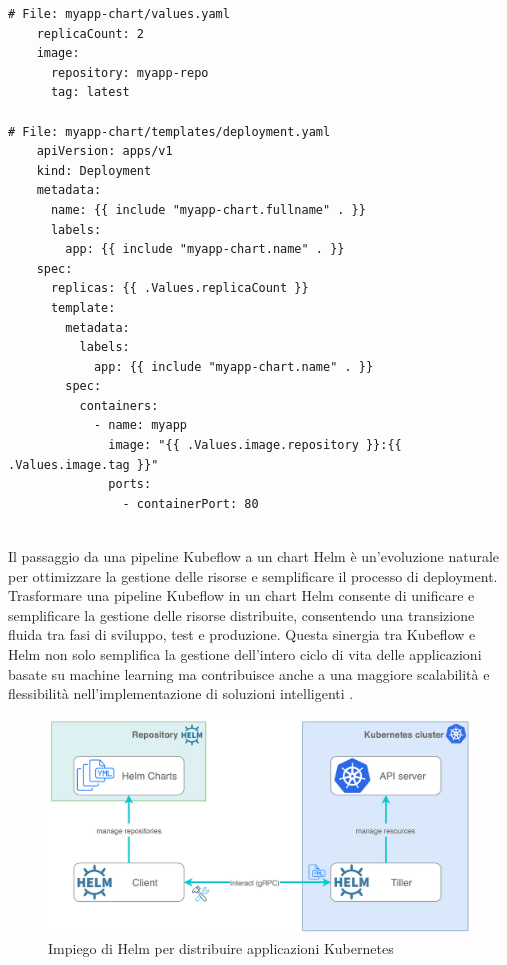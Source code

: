 \begin{code}
\label{code:apx:a:yaml}
\begin{verbatim}
# File: myapp-chart/values.yaml
    replicaCount: 2
    image:
      repository: myapp-repo
      tag: latest
    
# File: myapp-chart/templates/deployment.yaml
    apiVersion: apps/v1
    kind: Deployment
    metadata:
      name: {{ include "myapp-chart.fullname" . }}
      labels:
        app: {{ include "myapp-chart.name" . }}
    spec:
      replicas: {{ .Values.replicaCount }}
      template:
        metadata:
          labels:
            app: {{ include "myapp-chart.name" . }}
        spec:
          containers:
            - name: myapp
              image: "{{ .Values.image.repository }}:{{ .Values.image.tag }}"
              ports:
                - containerPort: 80
    
\end{verbatim}
\end{code}

Il passaggio da una pipeline Kubeflow a un chart Helm è un'evoluzione naturale per ottimizzare la gestione delle risorse e semplificare il processo di deployment. Trasformare una pipeline Kubeflow in un chart Helm consente di unificare e semplificare la gestione delle risorse distribuite, consentendo una transizione fluida tra fasi di sviluppo, test e produzione. Questa sinergia tra Kubeflow e Helm non solo semplifica la gestione dell'intero ciclo di vita delle applicazioni basate su machine learning ma contribuisce anche a una maggiore scalabilità e flessibilità nell'implementazione di soluzioni intelligenti \cite{kubeflow_helm_integration}.

\begin{figure}[h]
    \centering
    \includegraphics[width=\linewidth]{figures/ch6/helm.png}
    \caption[Impiego di Helm per distribuire applicazioni Kubernetes]{Impiego di Helm per distribuire applicazioni Kubernetes}
    \label{fig:cha6:helm}
\end{figure}

